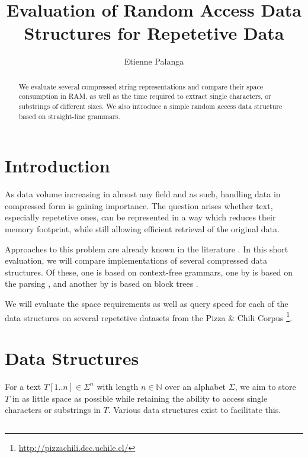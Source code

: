\documentclass{scrartcl}
\title{Evaluation of Random Access Data Structures for Repetetive Data}
\author{Etienne Palanga}
\begin{document}
\maketitle

\begin{abstract}
	We evaluate several compressed string representations and compare their space consumption in RAM,
	as well as the time required to extract single characters, or substrings of different sizes.
	We also introduce a simple random access data structure based on straight-line grammars.
\end{abstract}

\section{Introduction}

As data volume increasing in almost any field and as such, handling data in compressed form is gaining importance.
The question arises whether text, especially repetetive ones, can be represented in a way which reduces their memory footprint, while still allowing efficient retrieval of the original data.

Approaches to this problem are already known in the literature \cite{belazzougui_block_2021,bille_random_2013,kreft_self-index_2011,nunes_grammar_2022}.
In this short evaluation, we will compare implementations of several compressed data structures.
Of these, one is based on context-free grammars, one by \citeauthor{kreft_self-index_2011} is based on the \lzend{} parsing \cite{kreft_self-index_2011}, and another by \citeauthor{belazzougui_block_2021} is based on block trees \cite{belazzougui_block_2021}.

We will evaluate the space requirements as well as query speed for each of the data structures on several repetetive datasets from the Pizza \& Chili Corpus \footnote{\url{http://pizzachili.dcc.uchile.cl/}}.

\section{Data Structures}

For a text $T[1..n] \in \Sigma^n$ with length $n \in \mathbb{N}$ over an alphabet $\Sigma$, we aim to store $T$ in as little space as possible while retaining the ability to access single characters or substrings in $T$.
Various data structures exist to facilitate this.

\subsection{\lzend{}}
\end{document}
